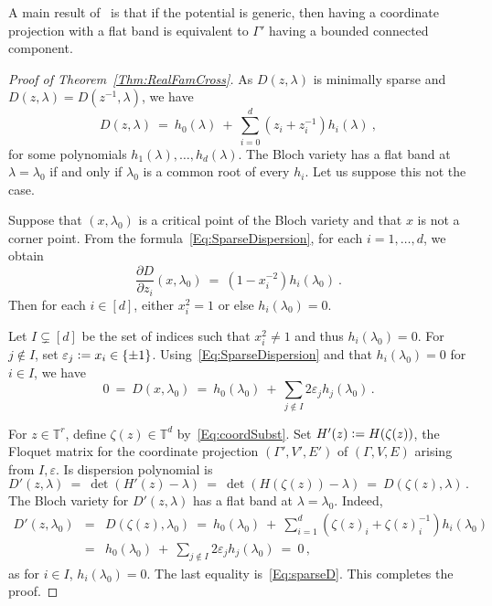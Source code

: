 \documentclass[12pt]{amsart}
\theoremstyle{remark}
\newenvironment{Remark}
{\pushQED{\qed}\renewcommand{\qedsymbol}{$\diamond$}\remark}
{\popQED\endremark}
\newcommand{\TT}{{\mathbb T}}
\newcommand{\defcolor}[1]{{\color{blue}#1}}
\begin{document}
\begin{Remark}\label{Rem:FK}
  A main result of~\cite{FaustKachkovskiy} is that if the potential is generic, then
  having a coordinate projection with a flat band is equivalent to $\Gamma'$ having a bounded connected component.
\end{Remark}

\begin{proof}[Proof of Theorem~\ref{Thm:RealFamCross}]
  As $D(z,\lambda)$ is minimally sparse and $D(z,\lambda)=D(z^{-1},\lambda)$, we have 
  \begin{equation}\label{Eq:SparseDispersion}
      D(z,\lambda)\ =\ h_0(\lambda)\ +\ \sum_{i=0}^d (z_i+z_i^{-1}) h_i(\lambda)\ ,
  \end{equation}
  for some polynomials $h_1(\lambda),\dotsc, h_d(\lambda)$.
  The Bloch variety has a flat band at $\lambda=\lambda_0$ if and only if $\lambda_0$ is a common root of every $h_i$.
  Let us suppose this not the case.

  Suppose that \defcolor{$(x,\lambda_0)$} is a critical point of the Bloch variety and that $x$ is not a corner point.
  From the formula~\eqref{Eq:SparseDispersion}, for each $i=1,\dotsc,d$, we obtain
  \[
  \frac{\partial D}{\partial z_i}(x,\lambda_0) \ =\ (1-x_i^{-2}) h_i(\lambda_0)\ .
  \]
  Then for each $i\in [d]$, either $x_i^2=1$ or else $h_i(\lambda_0)=0$.

  Let $I\subsetneq[d]$ be the set of indices such that $x_i^2\neq 1$ and thus $h_i(\lambda_0)=0$.
  For $j\not\in I$, set $\varepsilon_j\vcentcolon=x_i\in\{\pm1\}$.
  Using~\eqref{Eq:SparseDispersion} and that $h_i(\lambda_0)=0$ for $i\in I$, we have
  \begin{equation}\label{Eq:sparseD}
     0\ =\ D(x,\lambda_0)\ =\ h_0(\lambda_0)\ +\ \sum_{j\not\in I} 2\varepsilon_j h_j(\lambda_0)\,.
  \end{equation}

  For $z\in\TT^r$, define $\zeta(z)\in\TT^d$ by~\eqref{Eq:coordSubst}.
  Set $H'(z)\vcentcolon= H(\zeta(z))$, the Floquet matrix for the coordinate projection $(\Gamma',V',E')$ of
  $(\Gamma,V,E)$ arising from $I,\varepsilon$.
  Is dispersion polynomial is
  \[
  D'(z,\lambda)\ =\ \det(H'(z)-\lambda)\ =\ \det( H(\zeta(z))-\lambda)\ =\ D(\zeta(z),\lambda)\,.
  \]
  The Bloch variety for $D'(z,\lambda)$ has a flat band at $\lambda=\lambda_0$.
  Indeed,
  \begin{eqnarray*}
    D'(z,\lambda_0)
    &=& D(\zeta(z),\lambda_0)
       \ =\  h_0(\lambda_0)\ +\ \sum_{i=1}^d (\zeta(z)_i+\zeta(z)_i^{-1}) h_i(\lambda_0)\\
    & =& h_0(\lambda_0)\ +\ \sum_{j\not\in I} 2\varepsilon_j h_j(\lambda_0)\ =\ 0\,, 
  \end{eqnarray*}
  as for $i\in I$, $h_i(\lambda_0)=0$.
  The last equality is~\eqref{Eq:sparseD}.
  This completes the proof.
\end{proof}
\end{document}
